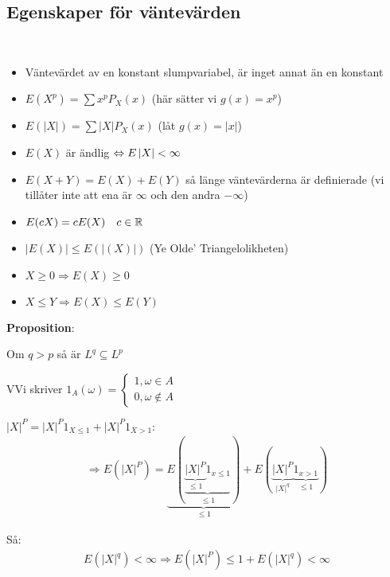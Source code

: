 \subsection{Egenskaper för väntevärden}\hfill\\
\begin{itemize}
  \item Väntevärdet av en konstant slumpvariabel, är inget annat än en konstant
  \item $E(X^p)=\sum x^pP_X(x)$ (här sätter vi $g(x) = x^p$)
  \item $E(\left|X\right|) = \sum \left|X\right|P_X(x)$ (låt $g(x) = \left|x\right|$)
  \item $E(X)$ är ändlig $\Leftrightarrow E\left|X\right|<\infty$
  \item $E(X+Y) = E(X)+E(Y)$ så länge väntevärderna är definierade (vi tillåter inte att ena är $\infty$ och den andra $-\infty$)
  \item $E(cX) = cE(X)\quad c\in\mathbb{R}$
  \item $\left|E(X)\right|\leq E(\left|(X)\right|)$ (Ye Olde' Triangelolikheten)
  \item $X\geq0\Rightarrow E(X)\geq0$
  \item $X\leq Y\Rightarrow E(X)\leq E(Y)$
\end{itemize}
\par\bigskip
\noindent\textbf{Proposition}:\par
\noindent Om $q>p$ så är $L^q\subseteq L^p$
\par\bigskip
\begin{prf}
  VVi skriver $1_A(\omega) = \begin{cases}1, \omega\in A\\0,\omega\notin A\end{cases}$\par\bigskip
  \noindent $\left|X\right|^P = \left|X\right|^P1_{X\leq1}+\left|X\right|^P1_{X>1}$:
  \begin{equation*}
    \begin{gathered}
      \Rightarrow E(\left|X\right|^P) = \underbrace{E\left(\underbrace{\underbrace{\left|X\right|^P}_{\text{$\leq1$}}1_{x\leq1}}_{\text{$\leq1$}}\right)}_{\text{$\leq1$}} + E(\underbrace{\left|X\right|^P}_{\text{$\left|X\right|^q$}}\underbrace{1_{x>1}}_{\text{$\leq1$}})
    \end{gathered}
  \end{equation*}\par
  \noindent Så:
  \begin{equation*}
    \begin{gathered}
      E(\left|X\right|^q)<\infty\Rightarrow E(\left|X\right|^P)\leq1+E(\left|X\right|^q)<\infty
    \end{gathered}
  \end{equation*}
\end{prf}
